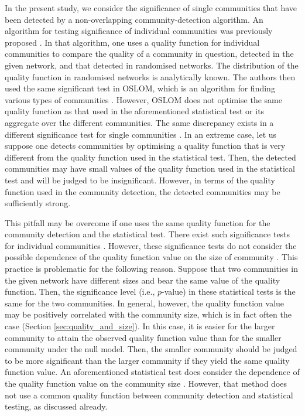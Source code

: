 \documentclass[fleqn,10pt]{wlscirep}
\begin{document}
In the present study, we consider the significance of single communities that have been detected by a non-overlapping community-detection algorithm. 
An algorithm for testing significance of individual communities was previously proposed \cite{Lancichinetti2010}.
In that algorithm, one uses a quality function for individual communities to compare the quality of a community in question, detected in the given network, and that detected in randomised networks.
The distribution of the quality function in randomised networks is analytically known.
The authors then used the same significant test in OSLOM, which is an algorithm for finding various types of communities \cite{Lancichinetti2011}. 
However, OSLOM does not optimise the same quality function as that used in the aforementioned statistical test or its aggregate over the different communities. 
The same discrepancy exists in a different significance test for single communities \cite{Spirin2003}. 
In an extreme case, let us suppose one detects communities by optimising a quality function that is very different from the quality function used in the statistical test. Then, the detected communities may have small values of the quality function used in the statistical test and will be judged to be insignificant.
However, in terms of the quality function used in the community detection, the detected communities may be sufficiently strong.

This pitfall may be overcome if one uses the same quality function for the community detection and the statistical test.
There exist such significance tests for individual communities \cite{Wang2008,Zhao2011}.
However, these significance tests \cite{Wang2008,Zhao2011} do not consider the possible dependence of the quality function value on the size of community \cite{Spirin2003,Leskovec2010,Yang2015}. 
This practice is problematic for the following reason. 
Suppose that two communities in the given network have different sizes and bear the same value of the quality function. 
Then, the significance level (i.e., $p$-value) in these statistical tests is the same for the two communities. 
In general, however, the quality function value may be positively correlated with the community size, which is in fact often the case (Section \ref{sec:quality_and_size}).  
In this case, it is easier for the larger community to attain the observed quality function value than for the smaller community under the null model. 
Then, the smaller community should be judged to be more significant than the larger community if they yield the same quality function value.
An aforementioned statistical test does consider the dependence of the quality function value on the community size \cite{Spirin2003}. 
However, that method does not use a common quality function between community detection and statistical testing, as discussed already.
\end{document}
